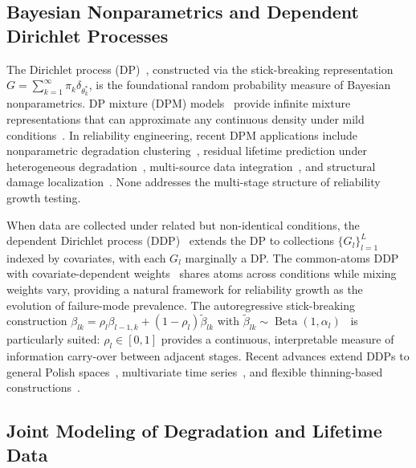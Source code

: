 \documentclass[a4paper,fleqn,longmktitle]{cas-sc}
\DeclareMathOperator{\Be}{Beta}
\begin{document}
\subsection{Bayesian Nonparametrics and Dependent Dirichlet Processes}
\label{sec:lit_bnp}

The Dirichlet process (DP)~\cite{Ferguson1973}, constructed via the stick-breaking representation~\cite{Sethuraman1994} $G = \sum_{k=1}^{\infty} \pi_k \delta_{\theta_k^*}$, is the foundational random probability measure of Bayesian nonparametrics. DP mixture (DPM) models~\cite{Lo1984,Escobar1995} provide infinite mixture representations that can approximate any continuous density under mild conditions~\cite{Ghosal2000}. In reliability engineering, recent DPM applications include nonparametric degradation clustering~\cite{Nguyen2023}, residual lifetime prediction under heterogeneous degradation~\cite{Karmakar2025}, multi-source data integration~\cite{Wang2025}, and structural damage localization~\cite{Yaoyama2025}. None addresses the multi-stage structure of reliability growth testing.

When data are collected under related but non-identical conditions, the dependent Dirichlet process (DDP)~\cite{MacEachern1999,MacEachern2000} extends the DP to collections $\{G_l\}_{l=1}^{L}$ indexed by covariates, with each $G_l$ marginally a DP. The common-atoms DDP with covariate-dependent weights~\cite{Griffin2011,Quintana2022} shares atoms across conditions while mixing weights vary, providing a natural framework for reliability growth as the evolution of failure-mode prevalence. The autoregressive stick-breaking construction $\beta_{lk} = \rho_l \beta_{l-1,k} + (1-\rho_l) \tilde{\beta}_{lk}$ with $\tilde{\beta}_{lk} \sim \Be(1,\alpha_l)$~\cite{Griffin2011} is particularly suited: $\rho_l \in [0,1]$ provides a continuous, interpretable measure of information carry-over between adjacent stages. Recent advances extend DDPs to general Polish spaces~\cite{Iturriaga2024}, multivariate time series~\cite{Bassetti2024}, and flexible thinning-based constructions~\cite{DAngelo2024}.

\subsection{Joint Modeling of Degradation and Lifetime Data}
\label{sec:lit_joint}
\end{document}
